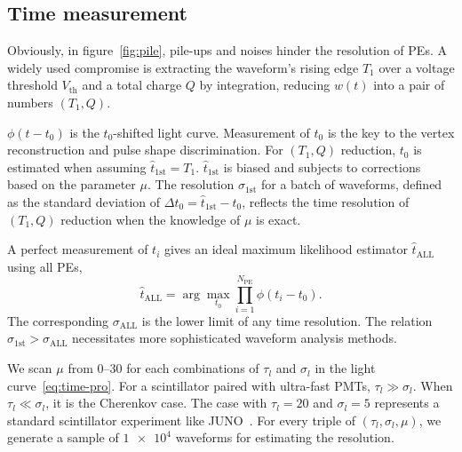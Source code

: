 \subsection{Time measurement}
Obviously, in figure~\ref{fig:pile}, pile-ups and noises hinder the resolution of PEs. A widely used compromise is extracting the waveform's rising edge $T_1$ over a voltage threshold $V_\mathrm{th}$ and a total charge $Q$ by integration, reducing $w(t)$ into a pair of numbers $(T_1, Q)$.

$\phi(t-t_0)$ is the $t_0$-shifted light curve. Measurement of $t_0$ is the key to the vertex reconstruction and pulse shape discrimination. For $(T_1, Q)$ reduction, $t_0$ is estimated when assuming $\hat{t}_\mathrm{1st} = T_1$. $\hat{t}_\mathrm{1st}$ is biased and subjects to corrections based on the parameter $\mu$. The resolution $\sigma_\mathrm{1st}$ for a batch of waveforms, defined as the standard deviation of $\Delta t_0 = \hat{t}_\mathrm{1st} - t_0$, reflects the time resolution of $(T_1, Q)$ reduction when the knowledge of $\mu$ is exact. 

A perfect measurement of $t_i$ gives an ideal maximum likelihood estimator $\hat{t}_\mathrm{ALL}$ using all PEs,
\begin{equation}
  \label{eq:2}
  \hat{t}_\mathrm{ALL} = \arg\underset{t_0}{\max} \prod_{i=1}^{N_\mathrm{PE}} \phi(t_i-t_0).
\end{equation}
The corresponding $\sigma_\mathrm{ALL}$ is the lower limit of any time resolution. The relation $\sigma_\mathrm{1st} > \sigma_\mathrm{ALL}$ necessitates more sophisticated waveform analysis methods.

We scan $\mu$ from \numrange{0}{30} for each combinations of $\tau_l$ and $\sigma_l$ in the light curve~\eqref{eq:time-pro}. For a scintillator paired with ultra-fast PMTs, $\tau_l \gg \sigma_l$. When $\tau_l \ll \sigma_l$, it is the Cherenkov case. The case with $\tau_l=20$ and $\sigma_l=5$ represents a standard scintillator experiment like JUNO~\cite{rebber_particle_2021}. For every triple of $(\tau_l, \sigma_l, \mu)$, we generate a sample of $\num[retain-unity-mantissa=false]{1e4}$ waveforms for estimating the resolution. 

